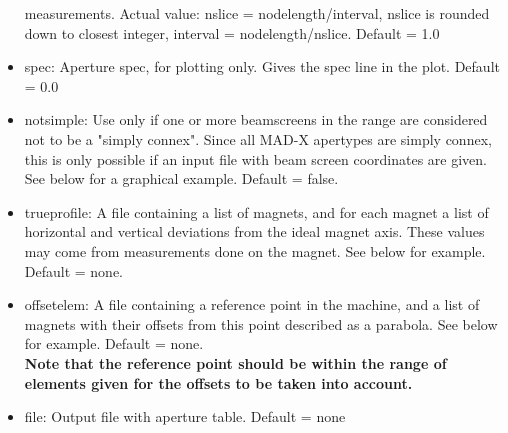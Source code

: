 \begin{itemize}
     measurements. Actual value:  nslice = nodelength/interval, nslice
     is rounded down to closest integer,  interval =
     nodelength/nslice. Default = 1.0  
   \item spec: Aperture spec, for plotting only. Gives the spec line in
     the plot. Default = 0.0  
   \item notsimple: Use only if one or more beamscreens in the range are
     considered not to  be a "simply connex". Since all MAD-X apertypes
     are simply connex, this is only possible  if an input file with
     beam screen coordinates are given. See below for a graphical
     example. Default = false.  
   \item trueprofile: A file containing a list of magnets, and for each
     magnet a list of horizontal and vertical deviations from the ideal
     magnet axis. These values may come from measurements done on the
     magnet. See below for example. Default = none.  
   \item offsetelem: A file containing a reference point in the machine,
     and a list of magnets with their offsets from this point described
     as a parabola. See below for example. Default = none. \\
     {\bf Note that the reference point should be within the range of
       elements given for the offsets to be taken into account.}
   \item file: Output file with aperture table. Default = none 
\end{itemize}


